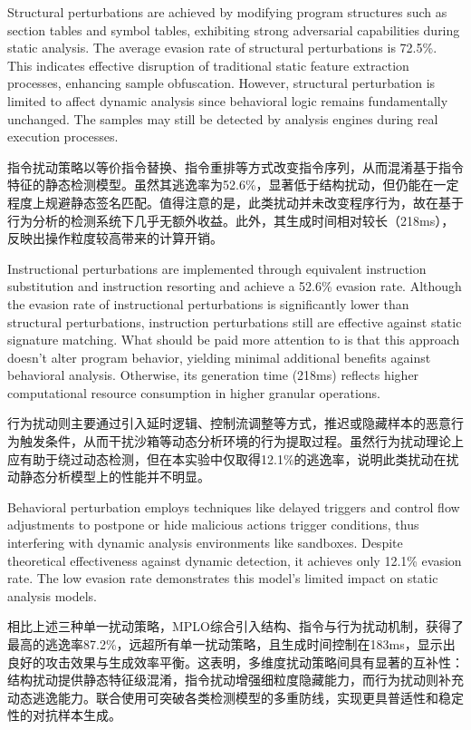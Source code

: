 Structural perturbations are achieved by modifying program structures such as section tables and symbol tables, exhibiting strong adversarial capabilities during static analysis. The average evasion rate of structural perturbations is 72.5\%. This indicates effective disruption of traditional static feature extraction processes, enhancing sample obfuscation. However, structural perturbation is limited to affect dynamic analysis since behavioral logic remains fundamentally unchanged. The samples may still be detected by analysis engines during real execution processes.

指令扰动策略以等价指令替换、指令重排等方式改变指令序列，从而混淆基于指令特征的静态检测模型。虽然其逃逸率为52.6\%，显著低于结构扰动，但仍能在一定程度上规避静态签名匹配。值得注意的是，此类扰动并未改变程序行为，故在基于行为分析的检测系统下几乎无额外收益。此外，其生成时间相对较长（218ms），反映出操作粒度较高带来的计算开销。

Instructional perturbations are implemented through equivalent instruction substitution and instruction resorting and achieve a 52.6\% evasion rate. Although the evasion rate of instructional perturbations is significantly lower than structural perturbations, instruction perturbations still are effective against static signature matching. What should be paid more attention to is that this approach doesn't alter program behavior, yielding minimal additional benefits against behavioral analysis. Otherwise, its generation time (218ms) reflects higher computational resource consumption in higher granular operations.

行为扰动则主要通过引入延时逻辑、控制流调整等方式，推迟或隐藏样本的恶意行为触发条件，从而干扰沙箱等动态分析环境的行为提取过程。虽然行为扰动理论上应有助于绕过动态检测，但在本实验中仅取得12.1\%的逃逸率，说明此类扰动在扰动静态分析模型上的性能并不明显。

Behavioral perturbation employs techniques like delayed triggers and control flow adjustments to postpone or hide malicious actions trigger conditions, thus interfering with dynamic analysis environments like sandboxes. Despite theoretical effectiveness against dynamic detection, it achieves only 12.1\% evasion rate. The low evasion rate demonstrates this model's limited impact on static analysis models.

相比上述三种单一扰动策略，MPLO综合引入结构、指令与行为扰动机制，获得了最高的逃逸率87.2\%，远超所有单一扰动策略，且生成时间控制在183ms，显示出良好的攻击效果与生成效率平衡。这表明，多维度扰动策略间具有显著的互补性：结构扰动提供静态特征级混淆，指令扰动增强细粒度隐藏能力，而行为扰动则补充动态逃逸能力。联合使用可突破各类检测模型的多重防线，实现更具普适性和稳定性的对抗样本生成。

